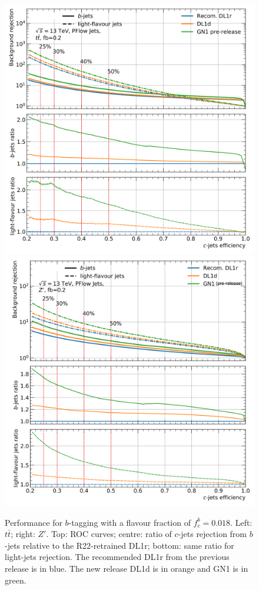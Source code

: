 \begin{figure}[h!]
{  }
  \caption{Performance for $b$-tagging with a flavour fraction of $f^b_c = 0.018$. Left: $t\bar{t}$; right: $Z'$. Top: ROC curves; centre: ratio of $c$-jets rejection from $b$-jets relative to the R22-retrained DL1r; bottom: same ratio for light-jets rejection. The recommended DL1r from the previous release is in blue. The new release DL1d is in orange and GN1 is in green.}
  \label{fig:DL1dtt}
  \bigskip
  \centerline{
  \includegraphics[scale=0.45]{Images/FTAG/DL1d/ROC/ttc.png}
  \includegraphics[scale=0.45]{Images/FTAG/DL1d/ROC/zpc.png}
}
\end{figure}
